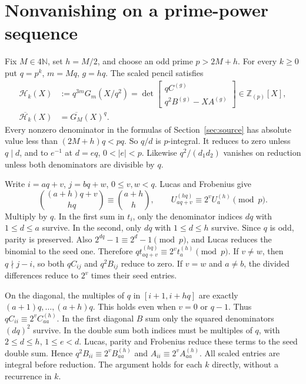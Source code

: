 \section{Nonvanishing on a prime-power sequence}\label{sec:nonvanishing}

Fix \(M\in4\mathbb N\), set \(h=M/2\), and choose an odd prime \(p>2M+h\).
For every \(k\ge0\) put \(q=p^k\), \(m=Mq\), \(g=hq\). The scaled pencil
satisfies
\begin{equation}\label{eq:nv-pencil}
\begin{aligned}
 \mathcal H_k(X)&:=q^{3m}G_m(X/q^2)
 =\det\begin{bmatrix}qC^{(g)}\\q^2B^{(g)}-XA^{(g)}\end{bmatrix}
 \in\mathbb Z_{(p)}[X],\\
 \overline{\mathcal H_k}(X)&=\overline{G_M}(X)^q.
\end{aligned}
\end{equation}
Every nonzero denominator in the formulas of Section~\ref{sec:source} has
absolute value less than \((2M+h)q<pq\). So \(q/d\) is \(p\)-integral. It
reduces to zero unless \(q\mid d\), and to \(e^{-1}\) at \(d=eq\),
\(0<|e|<p\). Likewise \(q^2/(d_1d_2)\) vanishes on reduction unless both
denominators are divisible by \(q\).

Write \(i=aq+v\), \(j=bq+w\), \(0\le v,w<q\). Lucas and Frobenius give
\begin{equation}\label{eq:nv-lucas}
 \binom{(a+h)q+v}{hq}\equiv\binom{a+h}{h},\qquad
 U_{aq+v}^{(hq)}\equiv2^v U_a^{(h)}\pmod p.
\end{equation}
Multiply by \(q\). In the first sum in \(t_i\), only the denominator
indices \(dq\) with \(1\le d\le a\) survive. In the second, only \(dq\) with
\(1\le d\le h\) survive. Since \(q\) is odd, parity is preserved. Also
\(2^{dq}-1\equiv2^d-1\pmod p\), and Lucas reduces the binomial to the seed
one. Therefore \(qt_{aq+v}^{(hq)}\equiv2^vt_a^{(h)}\pmod p\). If \(v\ne
w\), then \(q\nmid j-i\), so both \(qC_{ij}\) and \(q^2B_{ij}\) reduce to
zero. If \(v=w\) and \(a\ne b\), the divided differences reduce to \(2^v\)
times their seed entries.

On the diagonal, the multiples of \(q\) in \([i+1,i+hq]\) are exactly
\((a+1)q,\ldots,(a+h)q\). This holds even when \(v=0\) or \(q-1\). Thus
\(qC_{ii}\equiv2^vC_{aa}^{(h)}\). In the first diagonal \(B\) sum only the
squared denominators \((dq)^2\) survive. In the double sum both indices must
be multiples of \(q\), with \(2\le d\le h\), \(1\le e<d\). Lucas, parity and
Frobenius reduce these terms to the seed double sum. Hence
\(q^2B_{ii}\equiv2^vB_{aa}^{(h)}\) and \(A_{ii}\equiv2^vA_{aa}^{(h)}\). All
scaled entries are integral before reduction. The argument holds for each
\(k\) directly, without a recurrence in \(k\).

